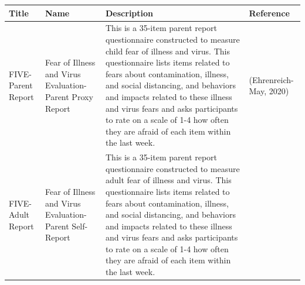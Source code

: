 \documentclass[]{book}
\begin{document}
\begin{longtable}[]{@{}llll@{}}
\toprule
\begin{minipage}[b]{0.22\columnwidth}\raggedright
Title\strut
\end{minipage} & \begin{minipage}[b]{0.27\columnwidth}\raggedright
Name\strut
\end{minipage} & \begin{minipage}[b]{0.22\columnwidth}\raggedright
Description\strut
\end{minipage} & \begin{minipage}[b]{0.18\columnwidth}\raggedright
Reference\strut
\end{minipage}\tabularnewline
\midrule
\endhead
\begin{minipage}[t]{0.22\columnwidth}\raggedright
FIVE-Parent Report\strut
\end{minipage} & \begin{minipage}[t]{0.27\columnwidth}\raggedright
Fear of Illness and Virus Evaluation- Parent Proxy Report\strut
\end{minipage} & \begin{minipage}[t]{0.22\columnwidth}\raggedright
This is a 35-item parent report questionnaire constructed to measure child fear of illness and virus. This questionnaire lists items related to fears about contamination, illness, and social distancing, and behaviors and impacts related to these illness and virus fears and asks participants to rate on a scale of 1-4 how often they are afraid of each item within the last week.\strut
\end{minipage} & \begin{minipage}[t]{0.18\columnwidth}\raggedright
(Ehrenreich-May, 2020)\strut
\end{minipage}\tabularnewline
\begin{minipage}[t]{0.22\columnwidth}\raggedright
FIVE- Adult Report\strut
\end{minipage} & \begin{minipage}[t]{0.27\columnwidth}\raggedright
Fear of Illness and Virus Evaluation- Parent Self-Report\strut
\end{minipage} & \begin{minipage}[t]{0.22\columnwidth}\raggedright
This is a 35-item parent report questionnaire constructed to measure adult fear of illness and virus. This questionnaire lists items related to fears about contamination, illness, and social distancing, and behaviors and impacts related to these illness and virus fears and asks participants to rate on a scale of 1-4 how often they are afraid of each item within the last week.\strut

\end{minipage}
\end{longtable}
\end{document}
